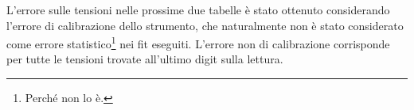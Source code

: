 \documentclass[a4paper,10pt]{article}
\begin{document}
\pagebreak

L'errore sulle tensioni nelle prossime due tabelle è stato ottenuto considerando l'errore di calibrazione dello strumento, che naturalmente non è stato considerato come errore statistico\footnote{Perché non lo è.} nei fit eseguiti.
L'errore non di calibrazione corrisponde per tutte le tensioni trovate all'ultimo digit sulla lettura.

\begin{table}[H]
	\centering
	
	\caption{.}
	\label{tab:lastfit}
\end{table}

\begin{table}[H]
	\centering
	
	\caption{.}
	\label{tab:lastfit1}
\end{table}
\end{document}
